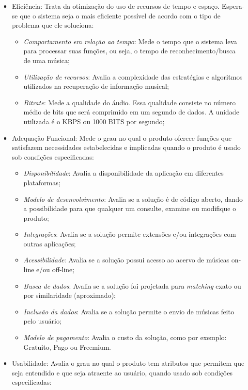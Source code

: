 \begin{itemize}
    \item Eficiência: Trata da otimização do uso de recursos de tempo e espaço. Espera-se que o sistema seja o mais eficiente possível de acordo com o tipo de problema que ele soluciona:
    \begin{itemize}
        \item \textit{Comportamento em relação ao tempo}: Mede o tempo que o sistema leva para processar suas funções, ou seja, o tempo de reconhecimento/busca de uma música;
        \item \textit{Utilização de recursos}: Avalia a complexidade das estratégias e algoritmos utilizados na recuperação de informação musical;
        \item \textit{Bitrate}: Mede a qualidade do áudio. Essa qualidade consiste no número médio de bits que será comprimido em um segundo de dados. A unidade utilizada é o KBPS ou 1000 BITS por segundo;
    \end{itemize}
    \item Adequação Funcional: Mede o grau no qual o produto oferece funções que satisfazem necessidades estabelecidas e implicadas quando o produto é usado sob condições especificadas:
    \begin{itemize}
        \item \textit{Disponibilidade}: Avalia a disponibilidade da aplicação em diferentes plataformas;
        \item \textit{Modelo de desenvolvimento}: Avalia se a solução é de código aberto, dando a possibilidade para que qualquer um consulte, examine ou modifique o produto;
        \item \textit{Integrações}: Avalia se a solução permite extensões e/ou integrações com outras aplicações;
        \item \textit{Acessibilidade}: Avalia se a solução possui acesso ao acervo de músicas on-line e/ou off-line;
        \item \textit{Busca de dados}: Avalia se a solução foi projetada para \textit{matching} exato ou por similaridade (aproximado);
        \item \textit{Inclusão da dados}: Avalia se a solução permite o envio de músicas feito pelo usuário;
        \item \textit{Modelo de pagamento}: Avalia o custo da solução, como por exemplo: Gratuito, Pago ou Freemium.
    \end{itemize}
    \item Usabilidade: Avalia o grau no qual o produto tem atributos que permitem que seja entendido e que seja atraente ao usuário, quando usado sob condições especificadas:

\end{itemize}
